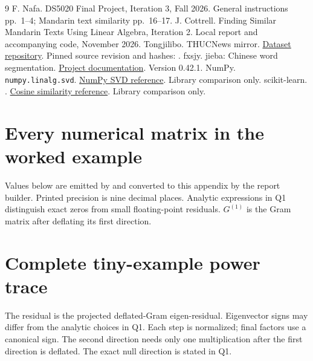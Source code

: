 \documentclass[11pt]{article}
\newcommand{\resultspath}{../results}
\begin{document}
\begin{thebibliography}{9}
 F. Nafa. DS5020 Final Project, Iteration 3, Fall 2026.
General instructions pp.\ 1--4; Mandarin text similarity pp.\ 16--17.
 J. Cottrell. Finding Similar Mandarin Texts Using Linear
Algebra, Iteration 2. Local report and accompanying code, November 2026.
 Tongjilibo. THUCNews mirror.
\href{https://huggingface.co/datasets/Tongjilibo/THUCNews}{Dataset repository}.
Pinned source revision and hashes: .
 fxsjy. jieba: Chinese word segmentation.
\href{https://github.com/fxsjy/jieba}{Project documentation}. Version 0.42.1.
 NumPy. \texttt{numpy.linalg.svd}.
\href{https://numpy.org/doc/stable/reference/generated/numpy.linalg.svd.html}{NumPy SVD reference}.
Library comparison only.
 scikit-learn. .
\href{https://scikit-learn.org/stable/modules/generated/sklearn.metrics.pairwise.cosine_similarity.html}{Cosine similarity reference}.
Library comparison only.
\end{thebibliography}
\clearpage
\appendix
\section{Every numerical matrix in the worked example}
Values below are emitted by  and converted
to this appendix by the report builder. Printed precision is nine
decimal places. Analytic expressions in Q1 distinguish exact zeros
from small floating-point residuals. $G^{(1)}$ is the Gram matrix
after deflating its first direction.

\clearpage
\section{Complete tiny-example power trace}
The residual is the projected deflated-Gram eigen-residual.
Eigenvector signs may differ from the analytic choices in Q1.
Each step is normalized; final factors use a canonical sign.
The second direction needs only one multiplication after the first
direction is deflated. The exact null direction is stated in Q1.

\end{document}
